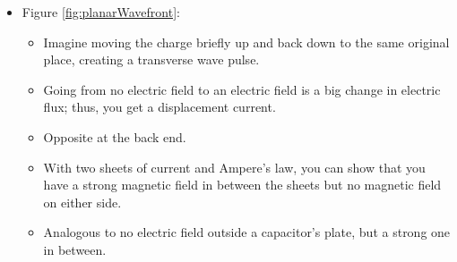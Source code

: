 \documentclass[../notes.tex]{subfiles}
\begin{document}
\begin{itemize}
\begin{itemize}
    \end{itemize}
    \item Figure \ref{fig:planarWavefront}:
    \begin{itemize}
        \item Imagine moving the charge briefly up and back down to the same original place, creating a transverse wave pulse.
        \item Going from no electric field to an electric field is a big change in electric flux; thus, you get a displacement current.
        \item Opposite at the back end.
        \item With two sheets of current and Ampere's law, you can show that you have a strong magnetic field in between the sheets but no magnetic field on either side.
        \item Analogous to no electric field outside a capacitor's plate, but a strong one in between.
    \end{itemize}
\end{itemize}
\end{document}
